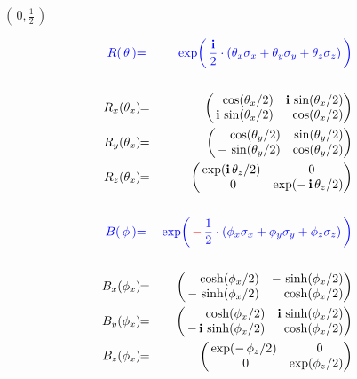 \begin{frame}{\headingColor\bf\LARGE}
\begin{multicols}{2}
	\begin{minipage}{7cm}
	\begin{center}
	\vskip -1cm
	\textbf{\Large$\left(\,0,\frac{1}{2}\,\right)$}
	\end{center}
	\vskip -0.3cm
	\begin{eqnarray*}
	{\color{blue}R(\,\mathbf{\theta}\,)}
	& {\color{blue}=} &
		{\color{blue}\exp\!\left(\,\frac{\i}{2}\cdot(\theta_{x}\sigma_{x}+\theta_{y}\sigma_{y}+\theta_{z}\sigma_{z})\,\right)}
	\\ \\
	R_{x}(\theta_{x})\!\!
	& = &
		\!\!\left(\!\!\begin{array}{rr} \cos(\theta_{x}/2) & \i\,\sin(\theta_{x}/2) \\ \i\,\sin(\theta_{x}/2) & \cos(\theta_{x}/2) \end{array}\!\!\!\right)
	\\
	R_{y}(\theta_{x})\!\!
	& = &
		\!\!\left(\!\!\begin{array}{rr} \cos(\theta_{y}/2) & \sin(\theta_{y}/2) \\ -\,\sin(\theta_{y}/2) & \cos(\theta_{y}/2) \end{array}\!\!\!\right)
	\\
	R_{z}(\theta_{x})\!\!
	& = &
		\!\!\left(\!\!\begin{array}{cc} \exp(\i\,\theta_{z}/2) & {\color{white}..}0 \\ {\color{white}.}0 & \exp(-\,\i\,\theta_{z}/2) \end{array}\!\!\!\right)
	\\ \\
	{\color{blue}B(\,\mathbf{\phi}\,)}
	& {\color{blue}=} &
		{\color{blue}\exp\!\left(\,{\color{red}-}\,\frac{1}{2}\cdot(\phi_{x}\sigma_{x}+\phi_{y}\sigma_{y}+\phi_{z}\sigma_{z})\,\right)}
	\\ \\
	B_{x}(\phi_{x})\!\!
	& = &
		\!\!\left(\!\!\begin{array}{rr} \cosh(\phi_{x}/2) & -\,\sinh(\phi_{x}/2) \\ -\,\sinh(\phi_{x}/2) & \cosh(\phi_{x}/2) \end{array}\!\!\!\right)
	\\
	B_{y}(\phi_{x})\!\!
	& = &
		\!\!\left(\!\!\begin{array}{rr} \cosh(\phi_{x}/2) & \i\,\sinh(\phi_{x}/2) \\ -\,\i\,\sinh(\phi_{x}/2) & \cosh(\phi_{x}/2) \end{array}\!\!\!\right)
	\\
	B_{z}(\phi_{x})\!\!
	&=&
		\!\!\left(\!\!\begin{array}{cc} \exp(-\,\phi_{z}/2) & {\color{white}..}0 \\ {\color{white}.}0 & \exp(\phi_{z}/2) \end{array}\!\!\!\right)
	\end{eqnarray*}
	\end{minipage}

\end{multicols}

\end{frame}
\normalsize

